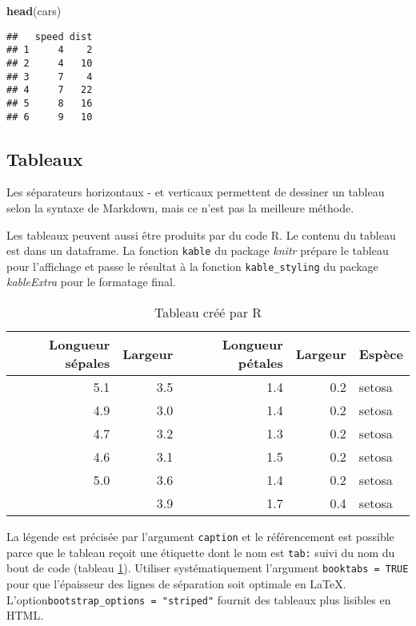 \documentclass[fleqn,10pt]{latex/stylish_article} %
\newenvironment{Shaded}{\begin{snugshade}}{\end{snugshade}}
\newcommand{\KeywordTok}[1]{\textcolor[rgb]{0.13,0.29,0.53}{\textbf{{#1}}}}
\newcommand{\NormalTok}[1]{{#1}}
\begin{document}
\scriptsize

\begin{Shaded}
\begin{Highlighting}[]
\KeywordTok{head}\NormalTok{(cars)}
\end{Highlighting}
\end{Shaded}

\begin{verbatim}
##   speed dist
## 1     4    2
## 2     4   10
## 3     7    4
## 4     7   22
## 5     8   16
## 6     9   10
\end{verbatim}

\normalsize

\hypertarget{tableaux}{%
\subsection{Tableaux}\label{tableaux}}

Les séparateurs horizontaux - et verticaux \textbar{} permettent de dessiner un tableau selon la syntaxe de Markdown, mais ce n'est pas la meilleure méthode.

Les tableaux peuvent aussi être produits par du code R.
Le contenu du tableau est dans un dataframe.
La fonction \texttt{kable} du package \emph{knitr} prépare le tableau pour l'affichage et passe le résultat à la fonction \texttt{kable\_styling} du package \emph{kableExtra} pour le formatage final.

\scriptsize

\begin{longtable}[t]{rrrrl}
\caption{\label{tab:kable}Tableau créé par R}\\
\toprule
Longueur sépales & Largeur & Longueur pétales & Largeur & Espèce\\
\midrule
5.1 & 3.5 & 1.4 & 0.2 & setosa\\
4.9 & 3.0 & 1.4 & 0.2 & setosa\\
4.7 & 3.2 & 1.3 & 0.2 & setosa\\
4.6 & 3.1 & 1.5 & 0.2 & setosa\\
5.0 & 3.6 & 1.4 & 0.2 & setosa\\
\addlinespace
5.4 & 3.9 & 1.7 & 0.4 & setosa\\
\bottomrule
\end{longtable}

\normalsize

La légende est précisée par l'argument \texttt{caption} et le référencement est possible parce que le tableau reçoit une étiquette dont le nom est \texttt{tab:} suivi du nom du bout de code (tableau \ref{tab:kable}).
Utiliser systématiquement l'argument \texttt{booktabs\ =\ TRUE} pour que l'épaisseur des lignes de séparation soit optimale en LaTeX.
L'option\break \texttt{bootstrap\_options\ =\ "striped"} fournit des tableaux plus lisibles en HTML.
\end{document}
